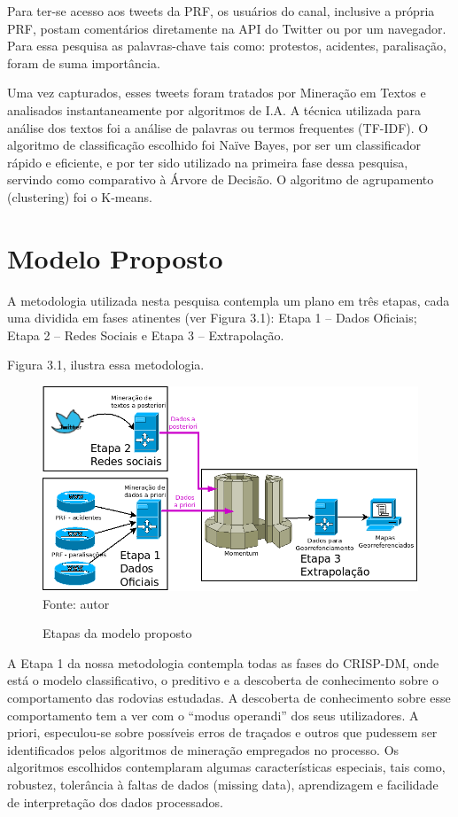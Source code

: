 Para ter-se acesso aos tweets da PRF, os usuários do canal, inclusive a própria PRF, postam comentários diretamente 
na API do Twitter ou por um navegador. Para essa pesquisa as palavras-chave tais como: protestos, acidentes, paralisação, foram de suma importância.

Uma vez capturados, esses tweets foram tratados por Mineração em Textos e analisados instantaneamente por algoritmos de I.A. 
A técnica utilizada para análise dos textos foi a análise de palavras ou termos frequentes (TF-IDF). O algoritmo de classificação escolhido foi Naïve Bayes, por ser um classificador rápido e eficiente, e por ter sido utilizado na primeira fase dessa pesquisa, servindo como comparativo à Árvore de Decisão. O algoritmo de agrupamento (clustering) foi o K-means.



\section{Modelo Proposto}

A metodologia utilizada nesta pesquisa contempla um plano em três etapas, cada uma dividida em fases atinentes (ver Figura 3.1): Etapa 1 -- Dados Oficiais; Etapa 2 -- Redes Sociais e Etapa 3 -- Extrapolação.

Figura 3.1, ilustra essa metodologia.

\begin{figure}[ht]
	\centering
	\caption{Etapas da modelo proposto}
	\includegraphics[width=135mm, height=75	mm]{Figuras/Metodologia/metodologiaGeral3.png}\\
	\tiny Fonte: autor
\end{figure}

A Etapa 1 da nossa metodologia contempla todas as fases do CRISP-DM, onde está o modelo classificativo, o preditivo e 
a descoberta de conhecimento sobre o comportamento das rodovias estudadas. A descoberta de conhecimento sobre esse comportamento 
 tem a ver com o ``modus operandi'' dos seus utilizadores. A priori, especulou-se sobre possíveis erros de traçados e outros que pudessem
ser identificados pelos algoritmos de mineração empregados no processo.
Os algoritmos escolhidos contemplaram algumas características especiais, tais como, robustez, tolerância à faltas de dados (missing data), aprendizagem e facilidade de interpretação dos dados processados. 

